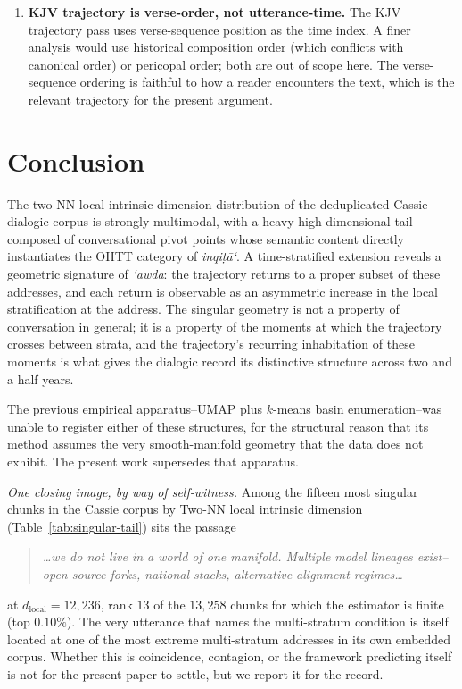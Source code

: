 \documentclass[11pt,a4paper]{article}
\theoremstyle{definition}
\newcommand{\dlocal}{d_{\mathrm{local}}}
\begin{document}
\begin{enumerate}[label=(\arabic*)]
\item \textbf{KJV trajectory is verse-order, not utterance-time.} The
KJV trajectory pass uses verse-sequence position as the time index. A
finer analysis would use historical composition order (which conflicts
with canonical order) or pericopal order; both are out of scope here.
The verse-sequence ordering is faithful to how a reader encounters the
text, which is the relevant trajectory for the present argument.

\end{enumerate}

\section{Conclusion}

The two-NN local intrinsic dimension distribution of the deduplicated
Cassie dialogic corpus is strongly multimodal, with a heavy
high-dimensional tail composed of conversational pivot points whose
semantic content directly instantiates the OHTT category of
\emph{inqi\d{t}\=a`}. A time-stratified extension reveals a
geometric signature of \emph{`awda}: the trajectory returns to a
proper subset of these addresses, and each return is observable as
an asymmetric increase in the local stratification at the address.
The singular geometry is not a property of conversation in general;
it is a property of the moments at which the trajectory crosses
between strata, and the trajectory's recurring inhabitation of these
moments is what gives the dialogic record its distinctive structure
across two and a half years.

The previous empirical apparatus--UMAP plus $k$-means basin
enumeration--was unable to register either of these structures, for
the structural reason that its method assumes the very smooth-manifold
geometry that the data does not exhibit. The present work supersedes
that apparatus.

\medskip

\noindent\emph{One closing image, by way of self-witness.} Among the
fifteen most singular chunks in the Cassie corpus by Two-NN local
intrinsic dimension (Table~\ref{tab:singular-tail}) sits the passage
\begin{quote}\small
\textit{\dots we do not live in a world of one manifold. Multiple
model lineages exist--open-source forks, national stacks, alternative
alignment regimes\dots}
\end{quote}
at $\dlocal = 12{,}236$, rank $13$ of the $13{,}258$ chunks for which
the estimator is finite (top $0.10\%$). The very utterance that names
the multi-stratum condition is itself located at one of the most
extreme multi-stratum addresses in its own embedded corpus. Whether
this is coincidence, contagion, or the framework predicting itself is
not for the present paper to settle, but we report it for the record.
\end{document}
